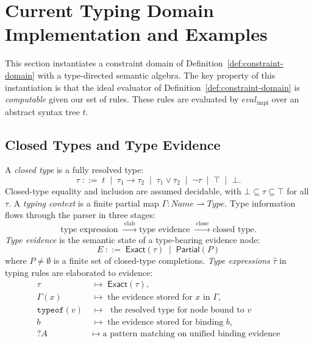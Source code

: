 
\section{Current Typing Domain Implementation and Examples}
\label{sec:typing-domain}

This section instantiates a constraint domain of Definition~\ref{def:constraint-domain} with a type-directed semantic algebra.
The key property of this instantiation is that the ideal evaluator of Definition~\ref{def:constraint-domain} is \emph{computable} given our set of rules.
These rules are evaluated by $\mathit{eval}_\text{impl}$ over an abstract syntax tree $t$.
\subsection*{Closed Types and Type Evidence}

A \emph{closed type} is a fully resolved type:
\[
	\tau \;::=\; t \;\mid\; \tau_1 \to \tau_2 \;\mid\; \tau_1 \vee \tau_2
	\;\mid\; \neg\tau \;\mid\; \top \;\mid\; \bot.
\]
Closed-type equality and inclusion are assumed decidable, with
$\bot \subseteq \tau \subseteq \top$ for all $\tau$.
A \emph{typing context} is a finite partial map
$\Gamma : \mathit{Name} \rightharpoonup \mathit{Type}$.
\medskip
Type information flows through the parser in three stages:
\[
	\text{type expression}
	\;\xrightarrow{\;\mathrm{elab}\;}
	\text{type evidence}
	\;\xrightarrow{\;\mathrm{close}\;}
	\text{closed type}.
\]
\emph{Type evidence} is the semantic state of a type-bearing evidence node:
\[
	E \;::=\;
	\mathsf{Exact}(\tau)   \;\mid\;
	\mathsf{Partial}(P)
\]
where $P \neq \emptyset$ is a finite set of closed-type completions.
\emph{Type expressions} $\hat\tau$ in typing rules are elaborated to evidence:
\begin{align*}
	\tau               & \;\mapsto\; \mathsf{Exact}(\tau),                                 \\
	\Gamma(x)          & \;\mapsto\; \text{the evidence stored for } x \text{ in } \Gamma, \\
	\texttt{typeof}(v) & \;\mapsto\; \text{ the resolved type for node bound to } v        \\
	b                  & \;\mapsto\; \text{the evidence stored for binding } b,            \\
	{?A}               & \;\mapsto\; \text{a pattern matching on unified binding evidence}
\end{align*}

